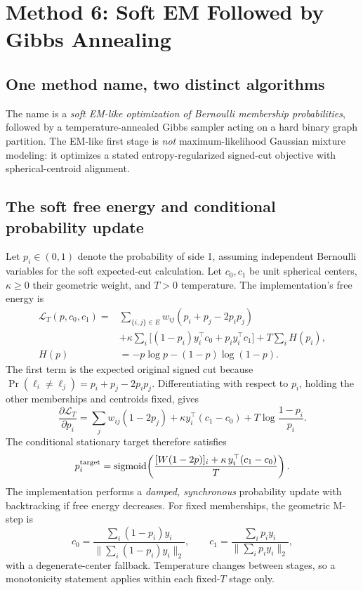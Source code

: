 \section{Method 6: Soft EM Followed by Gibbs Annealing}\label{sec:gibbs}
\subsection{One method name, two distinct algorithms}
The name  is a \emph{soft EM-like optimization of Bernoulli membership probabilities}, followed by a temperature-annealed Gibbs sampler acting on a hard binary graph partition. The EM-like first stage is \emph{not} maximum-likelihood Gaussian mixture modeling: it optimizes a stated entropy-regularized signed-cut objective with spherical-centroid alignment.

\subsection{The soft free energy and conditional probability update}
Let $p_i\in(0,1)$ denote the probability of side 1, assuming independent Bernoulli variables for the soft expected-cut calculation. Let $c_0,c_1$ be unit spherical centers, $\kappa\ge0$ their geometric weight, and $T>0$ temperature. The implementation's free energy is
\begin{align}\label{eq:freeenergy}
\mathcal L_T(p,c_0,c_1)
={}&\sum_{\{i,j\}\in E}
 w_{ij}(p_i+p_j-2p_ip_j)\nonumber\\
&+\kappa\sum_i\bigl[(1-p_i)y_i^\top c_0+
                           p_i y_i^\top c_1\bigr]+T\sum_iH(p_i),\\
H(p)&=-p\log p-(1-p)\log(1-p).\nonumber
\end{align}
The first term is the expected original signed cut because $\Pr(\ell_i\ne\ell_j)=p_i+p_j-2p_ip_j$. Differentiating with respect to $p_i$, holding the other memberships and centroids fixed, gives
\[
\frac{\partial\mathcal L_T}{\partial p_i}
=\sum_jw_{ij}(1-2p_j)+\kappa y_i^\top(c_1-c_0)
 +T\log\frac{1-p_i}{p_i}.
\]
The conditional stationary target therefore satisfies
\begin{equation}\label{eq:softupdate}
p_i^{\rm target}=
\operatorname{sigmoid}\!\left(
\frac{[W(1-2p)]_i+\kappa\,y_i^\top(c_1-c_0)}{T}\right).
\end{equation}
The implementation performs a \emph{damped, synchronous} probability update with backtracking if free energy decreases. For fixed memberships, the geometric M-step is
\begin{equation}\label{eq:softcenters}
c_0=\frac{\sum_i(1-p_i)y_i}{\|\sum_i(1-p_i)y_i\|_2},
\qquad
c_1=\frac{\sum_i p_i y_i}{\|\sum_i p_i y_i\|_2},
\end{equation}
with a degenerate-center fallback. Temperature changes between stages, so a monotonicity statement applies within each fixed-$T$ stage only.


